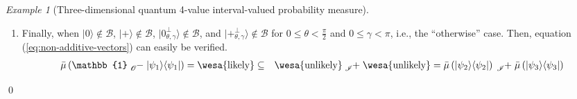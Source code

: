 \documentclass{article}
\theoremstyle{remark}
\newtheorem{example}{Example}
\newcommand{\ket}[1]{|#1\rangle}
\newcommand{\proj}[1]{|#1 \rangle\langle #1 |}
\newcommand{\ps}{\texttt{+}}
\newcommand{\likely}{{\mbox{\wesa{likely}}}}
\newcommand{\unlikely}{{\mbox{\wesa{unlikely}}}}
\newcommand{\amr}[1]{\fbox{\begin{minipage}{0.9\textwidth}\color{green}{Amr says: #1}\end{minipage}}}
\newcommand{\rme}{\mathrm{e}}
\newcommand{\rmi}{\mathrm{i}}
\begin{document}
\begin{example}[Three-dimensional quantum 4-value interval-valued
probability measure]
\begin{enumerate}
\[\begin{pmatrix}
\cos\left(\frac{\pi}{2}-\theta\right)
\end{pmatrix}=\rme^{-\rmi\gamma}\ket{\ps_{\frac{\pi}{2}-\theta,\pi+\gamma}^{\perp}}
\]
Because of $0\le\theta<\frac{\pi}{2}$ and $0\le\gamma<\pi$, we have
($0<\theta'=\frac{\pi}{2}-\theta<\frac{\pi}{2}$ and $\pi\le\gamma'=\pi+\gamma<2\pi$)
or $\theta'=\frac{\pi}{2}-\theta=\frac{\pi}{2}$. Similarly, when
$\ket{\psi_{1}}$ is $\ket{\ps_{\theta,\gamma}^{\perp}}$ and $\ket{\ps}\notin\mathcal{B}$,
equation (\ref{eq:non-additive-vectors}) holds.
\item Finally, when $\ket{0}\notin\mathcal{B}$, $\ket{\ps}\notin\mathcal{B}$,
$\ket{0_{\theta,\gamma}^{\perp}}\notin\mathcal{B}$, and $\ket{\ps_{\theta,\gamma}^{\perp}}\notin\mathcal{B}$
for $0\le\theta<\frac{\pi}{2}$ and $0\le\gamma<\pi$, i.e., the ``otherwise''
case. Then, equation (\ref{eq:non-additive-vectors}) can easily be
verified. 
\begin{eqnarray*}
\bar{\mu}\left(\mathbb{1}\tensor*[_{\mathscr{O}}]{-}{}\proj{\psi_{1}}\right)=\likely & \subseteq & \unlikely\tensor*[_{\mathscr{I}}]{+}{}\unlikely=\bar{\mu}\left(\proj{\psi_{2}}\right)\tensor*[_{\mathscr{I}}]{+}{}\bar{\mu}\left(\proj{\psi_{3}}\right)
\end{eqnarray*}
\end{enumerate}
\qed\end{example}

\amr{
We can use DQC if we have some kind of topology (distances). The idea
will be that we want to prepare state PSI but because of errors etc we
prepare a close state. Well the next closest state will be the next
state in our discrete grid. I am sure that a state that's very close
to PSI can involve some wrapping around.
}
\end{document}
